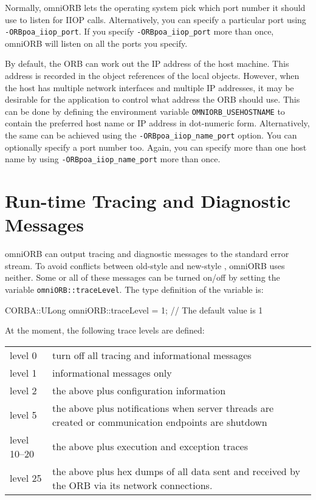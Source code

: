 \documentclass[11pt,twoside,a4paper]{book}
\newcommand{\code}[1]{\texttt{#1}}
\newcommand{\cmdline}[1]{\texttt{#1}}
\newcommand{\file}{\begingroup \urlstyle{tt}\Url}
\begin{document}
Normally, omniORB lets the operating system pick which port number it
should use to listen for IIOP calls. Alternatively, you can specify a
particular port using \cmdline{-ORBpoa\_iiop\_port}. If you specify
\cmdline{-ORBpoa\_iiop\_port} more than once, omniORB will listen on
all the ports you specify.

By default, the ORB can work out the IP address of the host machine.
This address is recorded in the object references of the local
objects. However, when the host has multiple network interfaces and
multiple IP addresses, it may be desirable for the application to
control what address the ORB should use. This can be done by defining
the environment variable \code{OMNIORB\_USEHOSTNAME} to contain the
preferred host name or IP address in dot-numeric form. Alternatively,
the same can be achieved using the \cmdline{-ORBpoa\_iiop\_name\_port}
option. You can optionally specify a port number too. Again, you can
specify more than one host name by using
\cmdline{-ORBpoa\_iiop\_name\_port} more than once.


\section{Run-time Tracing and Diagnostic Messages}
\label{rttrace}

omniORB can output tracing and diagnostic messages to the standard
error stream. To avoid conflicts between old-style \file{iostream.h}
and new-style \file{iostream}, omniORB uses neither. Some or all of
these messages can be turned {on/off} by setting the variable
\code{omniORB::traceLevel}. The type definition of the variable is:

\begin{cxxlisting}
CORBA::ULong omniORB::traceLevel = 1; // The default value is 1
\end{cxxlisting}

\noindent At the moment, the following trace levels are defined:

\vspace{\baselineskip}

\begin{tabular}{lp{}}

level 0      & turn off all tracing and informational messages\\
level 1      & informational messages only\\
level 2      & the above plus configuration information\\

level 5      & the above plus notifications when server threads are
               created or communication endpoints are shutdown\\

level 10--20 & the above plus execution and exception traces\\

level 25     & the above plus hex dumps of all data sent and received
               by the ORB via its network connections.\\
\end{tabular}
\end{document}
